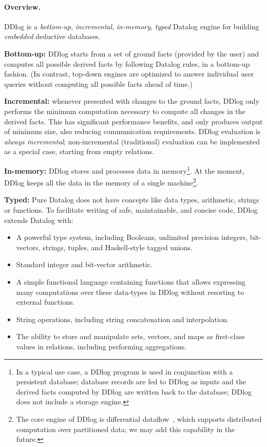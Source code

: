\paragraph{Overview.}
DDlog is a \emph{bottom-up}, \emph{incremental}, \emph{in-memory},
\emph{typed} Datalog engine for building \emph{embedded} deductive
databases.

\textbf{Bottom-up:} DDlog starts from a set of ground facts (provided
by the user) and computes all possible derived facts by following
Datalog rules, in a bottom-up fashion.  (In contrast, top-down engines
are optimized to answer individual user queries without computing all
possible facts ahead of time.)

\textbf{Incremental:} whenever presented with changes to the ground
facts, DDlog only performs the minimum computation necessary to
compute all changes in the derived facts.  This has significant
performance benefits, and only produces output of minimum size,
also reducing communication requirements.  DDlog evaluation is \emph{always
  incremental}; non-incremental (traditional) evaluation can be
implemented as a special case, starting from empty relations.

\textbf{In-memory:} DDlog stores and processes data in
memory\footnote{In a typical use case, a DDlog program is used in
  conjunction with a persistent database; database records are fed to
  DDlog as inputs and the derived facts computed by DDlog are written
  back to the database; DDlog does not include a storage engine.}.  At
the moment, DDlog keeps all the data in the memory of a single
machine\footnote{The core engine of DDlog is differential
  dataflow~\cite{differential-dataflow}, which supports distributed
  computation over partitioned data; we may add this capability in the
  future.}.

\textbf{Typed:} Pure Datalog does not have concepts like data types,
arithmetic, strings or functions.  To facilitate writing of safe,
maintainable, and concise code, DDlog extends Datalog with:
\begin{itemize}
\item A powerful type system, including Booleans, unlimited
  precision integers, bit-vectors, strings, tuples, and
  Haskell-style tagged unions.

\item Standard integer and bit-vector arithmetic.

\item A simple functional language containing functions that allows
  expressing many computations over these data-types in DDlog without
  resorting to external functions.

\item String operations, including string concatenation and
  interpolation.

\item The ability to store and manipulate sets, vectors, and maps as
  first-class values in relations, including performing aggregations.
\end{itemize}

